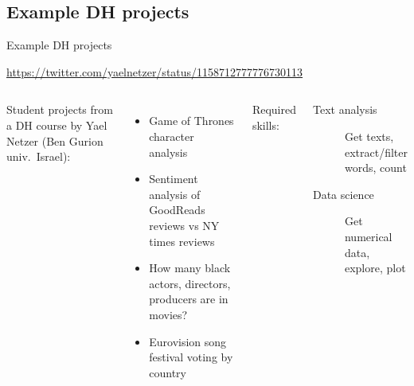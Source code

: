 \documentclass[aspectratio=169,usenames,dvipsnames]{beamer}
\begin{document}
\subsection{Example DH projects}
\frame{\tableofcontents[currentsubsection]}
\begin{frame}{Example DH projects}
\begin{reference}
\url{https://twitter.com/yaelnetzer/status/1158712777776730113}
\end{reference}
    \begin{columns}
            Student projects from a DH course by Yael Netzer (Ben Gurion univ.\ Israel):
            \begin{itemize}
                \item Game of Thrones character analysis
                \item Sentiment analysis of GoodReads reviews vs NY times reviews
                \item How many black actors, directors,
                    producers are in movies?
                \item Eurovision song festival voting by country
            \end{itemize}
        \pause
            Required skills:
            \begin{description}
                \item[Text analysis] Get texts, extract/filter words, count
                \item[Data science] Get numerical data, explore, plot
            \end{description}
    \end{columns}
\end{frame}
\end{document}

